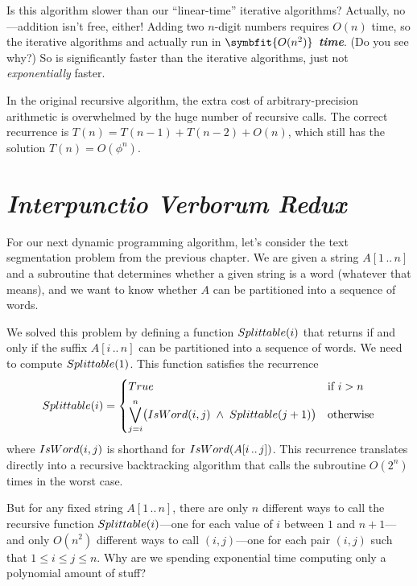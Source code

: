 Is this algorithm slower than our “linear-time” iterative algorithms?
Actually, no---addition isn’t free, either!
Adding two $n$-digit numbers requires $O(n)$ time, so the iterative algorithms  and  actually run in \textbf{\textit{$\symbfit{O(n^2)}$ time}}.
(Do you see why?)
So  is significantly faster than the iterative algorithms, just not \textit{exponentially} faster.

In the original recursive algorithm, the extra cost of arbitrary-precision arithmetic is overwhelmed by the huge number of recursive calls.
The correct recurrence is $T(n) = T(n-1) + T(n-2) + O(n)$, which still has the solution $T(n) = O(\phi^n)$.

\section{\textit{Interpunctio Verborum Redux}}
\label{sec:3.3}

For our next dynamic programming algorithm, let’s consider the text segmentation problem from the previous chapter.
We are given a string $A[1\,..\,n]$ and a subroutine  that determines whether a given string is a word (whatever that means), and we want to know whether $A$ can be partitioned into a sequence of words.

We solved this problem by defining a function $Splittable(i)$ that returns  if and only if the suffix $A[i\,..\,n]$ can be partitioned into a sequence of words.
We need to compute $Splittable(1)$.
This function satisfies the recurrence
\[
Splittable(i) = \begin{cases}
True & \text{if } i > n\\[1ex]
\displaystyle\bigvee_{j=i}^{n} \bigl(IsWord(i, j) \;\wedge\; Splittable(j+1)\bigr) & \text{otherwise}
\end{cases}
\]
where $IsWord(i, j)$ is shorthand for $IsWord(A[i\,..\,j])$.
This recurrence translates directly into a recursive backtracking algorithm that calls the  subroutine $O(2^n)$ times in the worst case.

But for any fixed string $A[1\,..\,n]$, there are only $n$ different ways to call the recursive function $Splittable(i)$---one for each value of $i$ between $1$ and $n+1$---and only $O(n^2)$ different ways to call $(i, j)$---one for each pair $(i, j)$ such that $1 \le i \le j \le n$.
Why are we spending exponential time computing only a polynomial amount of stuff?

